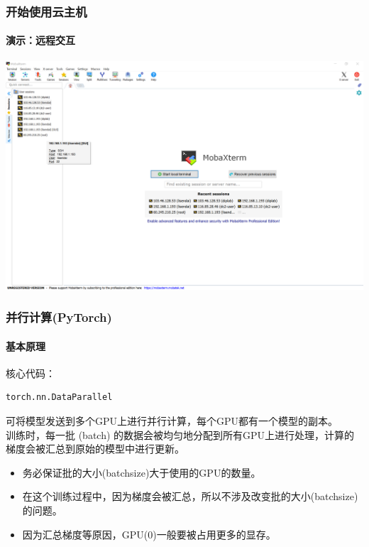 \documentclass[10pt]{beamer}
\begin{document}
    \begin{frame}
        \frametitle{开始使用云主机}
            \framesubtitle{演示：远程交互}

            \centering
            \hyperlink{frame5}{
                \includegraphics[scale=0.2]{src/img/MobaXterm.png}
                }

    \end{frame}

    \begin{frame}[fragile]
        \frametitle{并行计算(PyTorch)}
            \framesubtitle{基本原理}
                核心代码： \\
                \begin{lstlisting}
torch.nn.DataParallel                    
                \end{lstlisting}
                可将模型发送到多个GPU上进行并行计算，每个GPU都有一个模型的副本。\\
                训练时，每一批 (batch) 的数据会被均匀地分配到所有GPU上进行处理，计算的梯度会被汇总到原始的模型中进行更新。\\
                \hspace*{\fill}
                \begin{itemize}
                    \item 务必保证批的大小(batchsize)大于使用的GPU的数量。
                    \item 在这个训练过程中，因为梯度会被汇总，所以不涉及改变批的大小(batchsize)的问题。
                    \item 因为汇总梯度等原因，GPU(0)一般要被占用更多的显存。
                \end{itemize}

    \end{frame}
\end{document}
